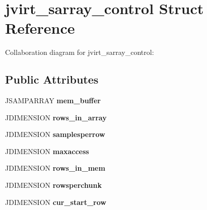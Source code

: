 \hypertarget{structjvirt__sarray__control}{\section{jvirt\+\_\+sarray\+\_\+control Struct Reference}
\label{structjvirt__sarray__control}
}


Collaboration diagram for jvirt\+\_\+sarray\+\_\+control\+:
\subsection*{Public Attributes}
\begin{DoxyCompactItemize}
\item 
\hypertarget{structjvirt__sarray__control_abc1f86c02141d80dc5d443e57a1d36d6}{J\+S\+A\+M\+P\+A\+R\+R\+A\+Y {\bfseries mem\+\_\+buffer}}\label{structjvirt__sarray__control_abc1f86c02141d80dc5d443e57a1d36d6}

\item 
\hypertarget{structjvirt__sarray__control_a17d42465a9cedfd4feeb93edfd8d134a}{J\+D\+I\+M\+E\+N\+S\+I\+O\+N {\bfseries rows\+\_\+in\+\_\+array}}\label{structjvirt__sarray__control_a17d42465a9cedfd4feeb93edfd8d134a}

\item 
\hypertarget{structjvirt__sarray__control_a3b6c756c3a71dc8023672093a60cc4f1}{J\+D\+I\+M\+E\+N\+S\+I\+O\+N {\bfseries samplesperrow}}\label{structjvirt__sarray__control_a3b6c756c3a71dc8023672093a60cc4f1}

\item 
\hypertarget{structjvirt__sarray__control_a719350d4faf724c6617a5892aae8ec2a}{J\+D\+I\+M\+E\+N\+S\+I\+O\+N {\bfseries maxaccess}}\label{structjvirt__sarray__control_a719350d4faf724c6617a5892aae8ec2a}

\item 
\hypertarget{structjvirt__sarray__control_aac15348d4b307c8aacc631b96aa3b547}{J\+D\+I\+M\+E\+N\+S\+I\+O\+N {\bfseries rows\+\_\+in\+\_\+mem}}\label{structjvirt__sarray__control_aac15348d4b307c8aacc631b96aa3b547}

\item 
\hypertarget{structjvirt__sarray__control_ad1c55661955e1600d447ad754c6aece1}{J\+D\+I\+M\+E\+N\+S\+I\+O\+N {\bfseries rowsperchunk}}\label{structjvirt__sarray__control_ad1c55661955e1600d447ad754c6aece1}

\item 
\hypertarget{structjvirt__sarray__control_a84ae28e5bf362228d7f43b486239e873}{J\+D\+I\+M\+E\+N\+S\+I\+O\+N {\bfseries cur\+\_\+start\+\_\+row}}\label{structjvirt__sarray__control_a84ae28e5bf362228d7f43b486239e873}


\end{DoxyCompactItemize}
